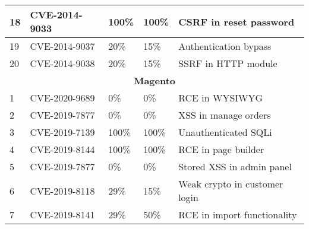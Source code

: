 \begin{table}[]
\begin{adjustbox}{max width=0.65\textwidth}
\begin{tabular}{|lllll|}
    \multicolumn{1}{|l|}{18}          & \multicolumn{1}{l|}{CVE-2014-9033}    & \multicolumn{1}{l|}{100\%}                & \multicolumn{1}{l|}{100\%}             & CSRF in reset password                  \\ \hline
    \multicolumn{1}{|l|}{19}          & \multicolumn{1}{l|}{CVE-2014-9037}    & \multicolumn{1}{l|}{20\%}                 & \multicolumn{1}{l|}{15\%}              & Authentication bypass                   \\ \hline
    \multicolumn{1}{|l|}{20}          & \multicolumn{1}{l|}{CVE-2014-9038}    & \multicolumn{1}{l|}{20\%}                 & \multicolumn{1}{l|}{15\%}              & SSRF in HTTP module                     \\ \hline
    \multicolumn{5}{|c|}{\textbf{Magento}}                                                                                                                                                                   \\ \hline
    \multicolumn{1}{|l|}{1}           & \multicolumn{1}{l|}{CVE-2020-9689}   & \multicolumn{1}{l|}{0\%}                   & \multicolumn{1}{l|}{0\%}               & RCE in WYSIWYG                           \\ \hline
    \multicolumn{1}{|l|}{2}           & \multicolumn{1}{l|}{CVE-2019-7877}   & \multicolumn{1}{l|}{0\%}                   & \multicolumn{1}{l|}{0\%}               & XSS in manage orders                     \\ \hline
    \multicolumn{1}{|l|}{3}           & \multicolumn{1}{l|}{CVE-2019-7139}   & \multicolumn{1}{l|}{100\%}                 & \multicolumn{1}{l|}{100\%}             & Unauthenticated SQLi                     \\ \hline
    \multicolumn{1}{|l|}{4}           & \multicolumn{1}{l|}{CVE-2019-8144}   & \multicolumn{1}{l|}{100\%}                 & \multicolumn{1}{l|}{100\%}             & RCE in page builder                      \\ \hline
    \multicolumn{1}{|l|}{5}           & \multicolumn{1}{l|}{CVE-2019-7877}   & \multicolumn{1}{l|}{0\%}                   & \multicolumn{1}{l|}{0\%}               & Stored XSS in admin panel                \\ \hline
    \multicolumn{1}{|l|}{6}           & \multicolumn{1}{l|}{CVE-2019-8118}   & \multicolumn{1}{l|}{29\%}                  & \multicolumn{1}{l|}{15\%}              & Weak crypto in customer login            \\ \hline
    \multicolumn{1}{|l|}{7}           & \multicolumn{1}{l|}{CVE-2019-8141}   & \multicolumn{1}{l|}{29\%}                  & \multicolumn{1}{l|}{50\%}              & RCE in import functionality              \\ \hline

\end{tabular}
\end{adjustbox}
\end{table}
